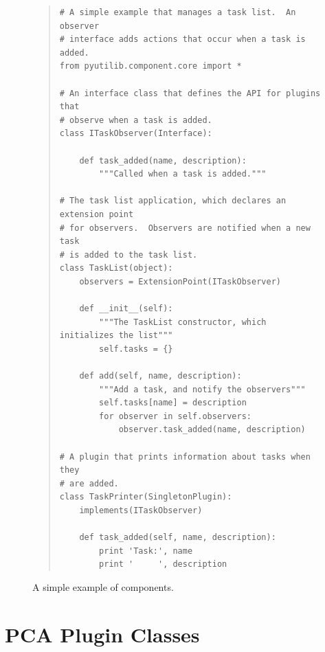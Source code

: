 \begin{figure}
\center
\begin{quotation}
\begin{lstlisting}
# A simple example that manages a task list.  An observer 
# interface adds actions that occur when a task is added.
from pyutilib.component.core import *

# An interface class that defines the API for plugins that
# observe when a task is added.
class ITaskObserver(Interface):

    def task_added(name, description):
        """Called when a task is added."""

# The task list application, which declares an extension point
# for observers.  Observers are notified when a new task
# is added to the task list.
class TaskList(object):
    observers = ExtensionPoint(ITaskObserver)

    def __init__(self):
        """The TaskList constructor, which initializes the list"""
        self.tasks = {}

    def add(self, name, description):
        """Add a task, and notify the observers"""
        self.tasks[name] = description
        for observer in self.observers:
            observer.task_added(name, description)

# A plugin that prints information about tasks when they
# are added.
class TaskPrinter(SingletonPlugin):
    implements(ITaskObserver)

    def task_added(self, name, description):
        print 'Task:', name
        print '     ', description
\end{lstlisting}
\end{quotation}
\caption{A simple example of \pcasp components.}
\label{fig:example1}
\end{figure}



\section{PCA Plugin Classes}
\label{chap:core}

